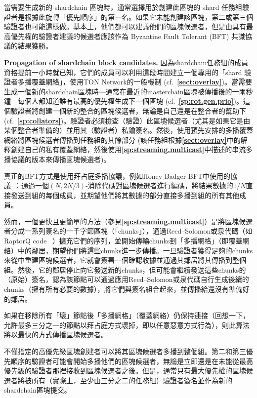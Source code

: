 \documentclass[12pt,oneside]{article}
\def\makepoint#1{\medbreak\noindent{\bf #1.\ }}
\def\nxsubpoint{\refstepcounter{subsubsection}%
  \smallbreak\makepoint{\thesubsubsection}}
\def\refpoint#1{{\rm\textbf{\ref{#1}}}}
\let\ptref=\refpoint
\def\embt(#1.){\textbf{#1.}}
\begin{document}
當需要生成新的 shardchain 區塊時，通常選擇用於創建此區塊的 shard 任務組驗證者是根據此旋轉「優先順序」的第一名。如果它未能創建該區塊，第二或第三個驗證者也可能這樣做。基本上，他們都可以建議他們的區塊候選者，但是由具有最高優先權的驗證者建議的候選者應該作為 Byzantine Fault Tolerant (BFT) 共識協議的結果獲勝。


\nxsubpoint\label{sp:sh.blk.cand.prop} \embt(Propagation of shardchain
block candidates.)  因為shardchain任務組的成員資格提前一小時就已知，它們的成員可以利用這段時間建立一個專用的「shard 驗證者多播覆蓋網絡」，使用TON Network的一般機制 (cf.~\ptref{sect:overlay})。當需要生成一個新的shardchain區塊時—通常在最近的masterchain區塊被傳播後的一兩秒鐘—每個人都知道誰有最高的優先權生成下一個區塊 (cf.~\ptref{sp:rot.gen.prio})。這個驗證者將創建一個新的整合的區塊候選者，無論是自己還是在整合者的幫助下 (cf.~\ptref{sp:collators})。驗證者必須檢查（驗證）此區塊候選者（尤其是如果它是由某個整合者準備的）並用其（驗證者）私鑰簽名。然後，使用預先安排的多播覆蓋網絡將區塊候選者傳播到任務組的其餘部分 (該任務組根據\ptref{sect:overlay}中的解釋創建自己的私有覆蓋網絡，然後使用\ptref{sp:streaming.multicast}中描述的串流多播協議的版本來傳播區塊候選者)。

真正的BFT方式是使用拜占庭多播協議，例如Honey Badger BFT中使用的協議~\cite{HoneyBadger}：通過一個$(N,2N/3)$-消除代碼對區塊候選者進行編碼，將結果數據的$1/N$直接發送到組的每個成員，並期望他們將其數據的部分直接多播到組的所有其他成員。

然而，一個更快且更簡單的方法（參見\ptref{sp:streaming.multicast}）是將區塊候選者分成一系列簽名的一千字節區塊（「chunks」），通過Reed--Solomon或泉代碼（如RaptorQ code~\cite{RaptorQ} \cite{Raptor}）擴充它們的序列，並開始傳輸chunks到「多播網格」（即覆蓋網絡）中的鄰居，期望他們將這些chunks進一步傳播。一旦驗證者獲得足夠的chunks來從中重建區塊候選者，它就會簽署一個確認收據並通過其鄰居將其傳播到整個組。然後，它的鄰居停止向它發送新的chunks，但可能會繼續發送這些chunks的（原始）簽名，認為該節點可以通過應用Reed--Solomon或泉代碼自行生成後續的chunks（擁有所有必要的數據），將它們與簽名組合起來，並傳播給還沒有準備好的鄰居。

如果在移除所有「壞」節點後「多播網格」（覆蓋網絡）仍保持連接（回想一下，允許最多三分之一的節點以拜占庭方式壞掉，即以任意惡意方式行為），則此算法將以最快的方式傳播區塊候選者。

不僅指定的高優先級區塊創建者可以將其區塊候選者多播到整個組。第二和第三優先順序的驗證者可能會開始多播他們的區塊候選者，無論是立即還是在未能從最高優先級的驗證者那裡接收到區塊候選者之後。但是，通常只有最大優先權的區塊候選者將被所有（實際上，至少由三分之二的任務組）驗證者簽名並作為新的shardchain區塊提交。
\end{document}
